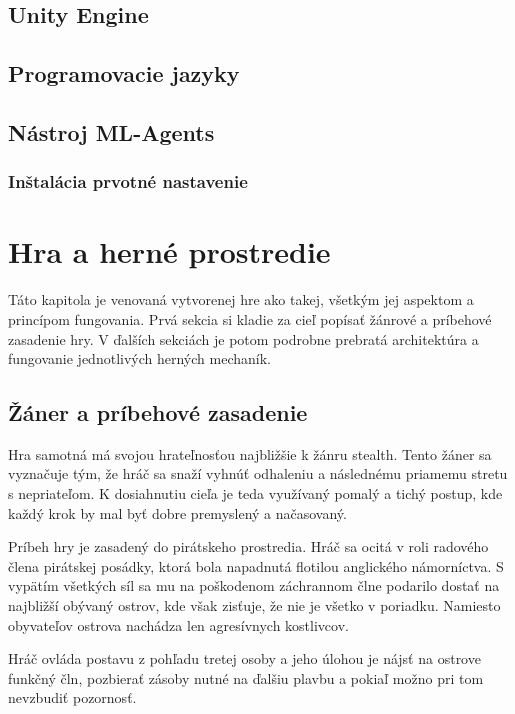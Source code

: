 \documentclass[slovak, master]{diploma}
\begin{document}
\section{Unity Engine}
\label{sec:Unity}
\section{Programovacie jazyky}
\label{sec:langs}
\section{Nástroj ML-Agents}
\label{sec:ML-Agents}
\subsection{Inštalácia prvotné nastavenie}
\label{sec:MLAgentsInstall}

\chapter{Hra a herné prostredie}
\label{sec:GameOverview}
Táto kapitola je venovaná vytvorenej hre ako takej, všetkým jej aspektom a princípom fungovania. Prvá sekcia si kladie za cieľ popísať žánrové a príbehové zasadenie hry. V ďalších sekciách je potom podrobne prebratá architektúra a fungovanie jednotlivých herných mechaník.

\section{Žáner a príbehové zasadenie}
\label{sec:GenreAndSetting}
Hra samotná má svojou hrateľnosťou najbližšie k žánru stealth. Tento žáner sa vyznačuje tým, že hráč sa snaží vyhnúť odhaleniu a následnému priamemu stretu s nepriateľom. K dosiahnutiu cieľa je teda využívaný pomalý a tichý postup, kde každý krok by mal byť dobre premyslený a načasovaný. 

Príbeh hry je zasadený do pirátskeho prostredia. Hráč sa ocitá v roli radového člena pirátskej posádky, ktorá bola napadnutá flotilou anglického námorníctva. S vypätím všetkých síl sa mu na poškodenom záchrannom člne podarilo dostať na najbližší obývaný ostrov, kde však zisťuje, že nie je všetko v poriadku. Namiesto obyvateľov ostrova nachádza len agresívnych kostlivcov. 

Hráč ovláda postavu z pohľadu tretej osoby a jeho úlohou je nájsť na ostrove funkčný čln, pozbierať zásoby nutné na ďalšiu plavbu a pokiaľ možno pri tom nevzbudiť pozornosť.
\end{document}
